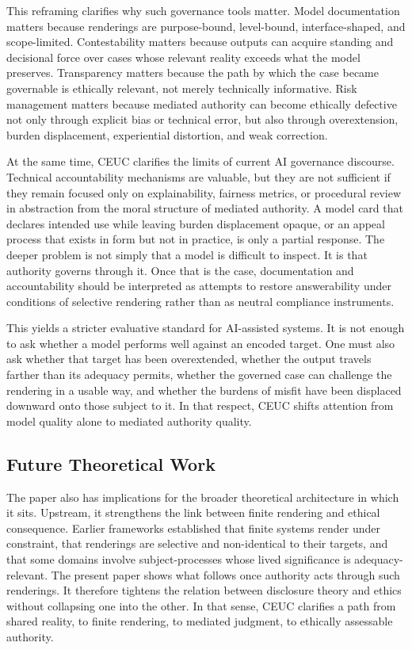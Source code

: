 \documentclass[11pt]{article}
\begin{document}
This reframing clarifies why such governance tools matter. Model documentation matters because renderings are purpose-bound, level-bound, interface-shaped, and scope-limited. Contestability matters because outputs can acquire standing and decisional force over cases whose relevant reality exceeds what the model preserves. Transparency matters because the path by which the case became governable is ethically relevant, not merely technically informative. Risk management matters because mediated authority can become ethically defective not only through explicit bias or technical error, but also through overextension, burden displacement, experiential distortion, and weak correction.

At the same time, CEUC clarifies the limits of current AI governance discourse. Technical accountability mechanisms are valuable, but they are not sufficient if they remain focused only on explainability, fairness metrics, or procedural review in abstraction from the moral structure of mediated authority. A model card that declares intended use while leaving burden displacement opaque, or an appeal process that exists in form but not in practice, is only a partial response. The deeper problem is not simply that a model is difficult to inspect. It is that authority governs through it. Once that is the case, documentation and accountability should be interpreted as attempts to restore answerability under conditions of selective rendering rather than as neutral compliance instruments.

This yields a stricter evaluative standard for AI-assisted systems. It is not enough to ask whether a model performs well against an encoded target. One must also ask whether that target has been overextended, whether the output travels farther than its adequacy permits, whether the governed case can challenge the rendering in a usable way, and whether the burdens of misfit have been displaced downward onto those subject to it. In that respect, CEUC shifts attention from model quality alone to mediated authority quality.

\subsection{Future Theoretical Work}

The paper also has implications for the broader theoretical architecture in which it sits. Upstream, it strengthens the link between finite rendering and ethical consequence. Earlier frameworks established that finite systems render under constraint, that renderings are selective and non-identical to their targets, and that some domains involve subject-processes whose lived significance is adequacy-relevant. The present paper shows what follows once authority acts through such renderings. It therefore tightens the relation between disclosure theory and ethics without collapsing one into the other. In that sense, CEUC clarifies a path from shared reality, to finite rendering, to mediated judgment, to ethically assessable authority. \cite{Swanson2026SharedRealityConditionDisclosure,Swanson2026ConstraintConditionDisclosure,Swanson2026EmbeddedProcess,Swanson2026MediatedJudgmentConstraint,Swanson2026ConstrainedDescribability}
\end{document}
